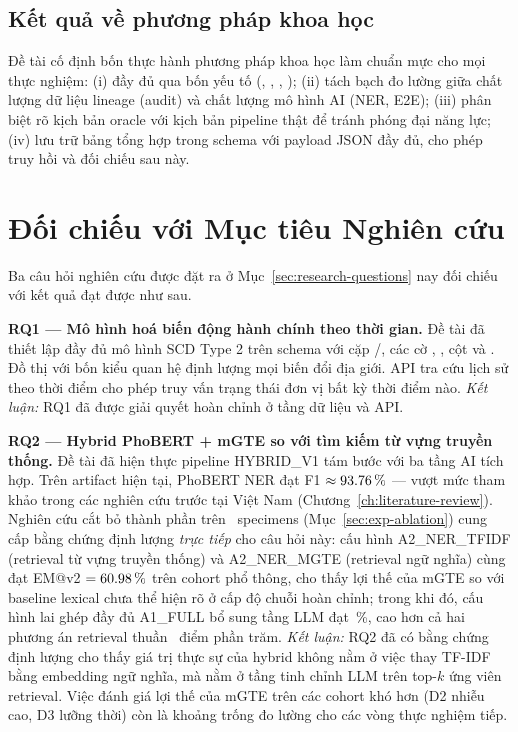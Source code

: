 \subsection{Kết quả về phương pháp khoa học}
\label{sec:concl-method}

Đề tài cố định bốn thực hành phương pháp khoa học làm chuẩn mực cho mọi thực nghiệm: (i)  đầy đủ qua bốn yếu tố (, , , ); (ii) tách bạch đo lường giữa chất lượng dữ liệu lineage (audit) và chất lượng mô hình AI (NER, E2E); (iii) phân biệt rõ kịch bản oracle với kịch bản pipeline thật để tránh phóng đại năng lực; (iv) lưu trữ bảng tổng hợp trong schema  với payload JSON đầy đủ, cho phép truy hồi và đối chiếu sau này.

\section{Đối chiếu với Mục tiêu Nghiên cứu}
\label{sec:concl-objectives}

Ba câu hỏi nghiên cứu được đặt ra ở Mục~\ref{sec:research-questions} nay đối chiếu với kết quả đạt được như sau.

\textbf{RQ1 --- Mô hình hoá biến động hành chính theo thời gian.} Đề tài đã thiết lập đầy đủ mô hình SCD Type 2 trên schema  với cặp /, các cờ , , cột  và . Đồ thị  với bốn kiểu quan hệ định lượng mọi biến đổi địa giới. API tra cứu lịch sử theo thời điểm cho phép truy vấn trạng thái đơn vị bất kỳ thời điểm nào. \emph{Kết luận:} RQ1 đã được giải quyết hoàn chỉnh ở tầng dữ liệu và API.

\textbf{RQ2 --- Hybrid PhoBERT + mGTE so với tìm kiếm từ vựng truyền thống.} Đề tài đã hiện thực pipeline HYBRID\_V1 tám bước với ba tầng AI tích hợp. Trên artifact hiện tại, PhoBERT NER đạt F1 \(\approx 93.76\,\%\) --- vượt mức tham khảo trong các nghiên cứu trước tại Việt Nam (Chương~\ref{ch:literature-review}). Nghiên cứu cắt bỏ thành phần trên \VNAIABLATIONTotalSpecimens\, specimens (Mục~\ref{sec:exp-ablation}) cung cấp bằng chứng định lượng \emph{trực tiếp} cho câu hỏi này: cấu hình A2\_NER\_TFIDF (retrieval từ vựng truyền thống) và A2\_NER\_MGTE (retrieval ngữ nghĩa) cùng đạt EM@v2 \(= 60.98\,\%\) trên cohort phổ thông, cho thấy lợi thế của mGTE so với baseline lexical chưa thể hiện rõ ở cấp độ chuỗi hoàn chỉnh; trong khi đó, cấu hình lai ghép đầy đủ A1\_FULL bổ sung tầng LLM đạt \VNAIABLATIONAOneEMvTwoPct\,\%, cao hơn cả hai phương án retrieval thuần \VNAIABLATIONLLMContributionPp\, điểm phần trăm. \emph{Kết luận:} RQ2 đã có bằng chứng định lượng cho thấy giá trị thực sự của hybrid không nằm ở việc thay TF-IDF bằng embedding ngữ nghĩa, mà nằm ở tầng tinh chỉnh LLM trên top-\(k\) ứng viên retrieval. Việc đánh giá lợi thế của mGTE trên các cohort khó hơn (D2 nhiễu cao, D3 lưỡng thời) còn là khoảng trống đo lường cho các vòng thực nghiệm tiếp.


